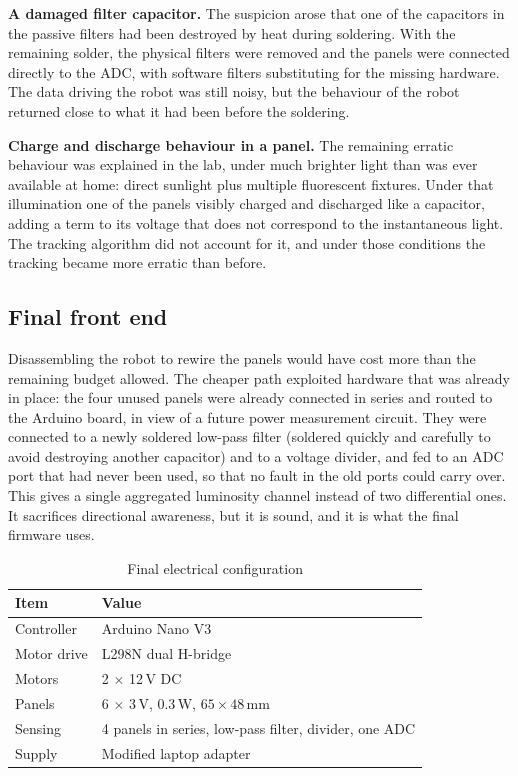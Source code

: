 \documentclass[10pt, conference, letterpaper]{IEEEtran}
\begin{document}
\textbf{A damaged filter capacitor.} The suspicion arose that one of the capacitors in the passive filters had been destroyed by heat during soldering. With the remaining solder, the physical filters were removed and the panels were connected directly to the ADC, with software filters substituting for the missing hardware. The data driving the robot was still noisy, but the behaviour of the robot returned close to what it had been before the soldering.

\textbf{Charge and discharge behaviour in a panel.} The remaining erratic behaviour was explained in the lab, under much brighter light than was ever available at home: direct sunlight plus multiple fluorescent fixtures. Under that illumination one of the panels visibly charged and discharged like a capacitor, adding a term to its voltage that does not correspond to the instantaneous light. The tracking algorithm did not account for it, and under those conditions the tracking became more erratic than before.

\subsection{Final front end}

Disassembling the robot to rewire the panels would have cost more than the remaining budget allowed. The cheaper path exploited hardware that was already in place: the four unused panels were already connected in series and routed to the Arduino board, in view of a future power measurement circuit. They were connected to a newly soldered low-pass filter (soldered quickly and carefully to avoid destroying another capacitor) and to a voltage divider, and fed to an ADC port that had never been used, so that no fault in the old ports could carry over. This gives a single aggregated luminosity channel instead of two differential ones. It sacrifices directional awareness, but it is sound, and it is what the final firmware uses.

\begin{table}[!t]
  \caption{Final electrical configuration}
  \label{tab:elec}
  \centering
  \begin{tabular}{@{}ll@{}}
    \toprule
    Item & Value \\
    \midrule
    Controller & Arduino Nano V3 \\
    Motor drive & L298N dual H-bridge \\
    Motors & 2 $\times$ 12\,V DC \\
    Panels & 6 $\times$ 3\,V, 0.3\,W, $65 \times 48$\,mm \\
    Sensing & 4 panels in series, low-pass filter, divider, one ADC \\
    Supply & Modified laptop adapter \\
    \bottomrule
  \end{tabular}
\end{table}
\end{document}
